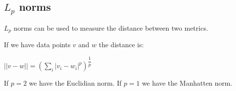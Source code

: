 
\subsection{\(L_p\) norms}

\(L_p\) norms can be used to measure the distance between two metrics.

If we have data points \(v\) and \(w\) the distance is:

\(||v-w||=(\sum_i |v_i-w_i|^p)^{\dfrac{1}{p}}\)

If \(p=2\) we have the Euclidian norm. If \(p=1\) we have the Manhatten norm.

